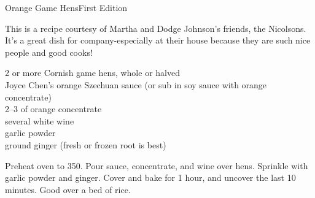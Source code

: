 \begin{entry}{Orange Game Hens}{First Edition}

\begin{open}
  This is a recipe courtesy of Martha and Dodge Johnson's friends, the Nicolsons. It's a great dish for company-especially at their house because they are such nice people and good cooks!
\end{open}
\begin{ingredients}
  2 or more Cornish game hens, whole or halved\\
  Joyce Chen's orange Szechuan sauce (or sub in soy sauce with orange
  concentrate)\\
  \SIrange{2}{3}{\tblspoon} of orange concentrate\\
  several \si{\tblspoon} white wine\\
  garlic powder\\
  ground ginger (fresh or frozen root is best)
\end{ingredients}
Preheat oven to \SI{350}{\degreeF}. Pour sauce, concentrate, and wine over
hens. Sprinkle with garlic powder and ginger. Cover and bake for
1 hour, and uncover the last 10 minutes. Good over a bed of rice.
\end{entry}

